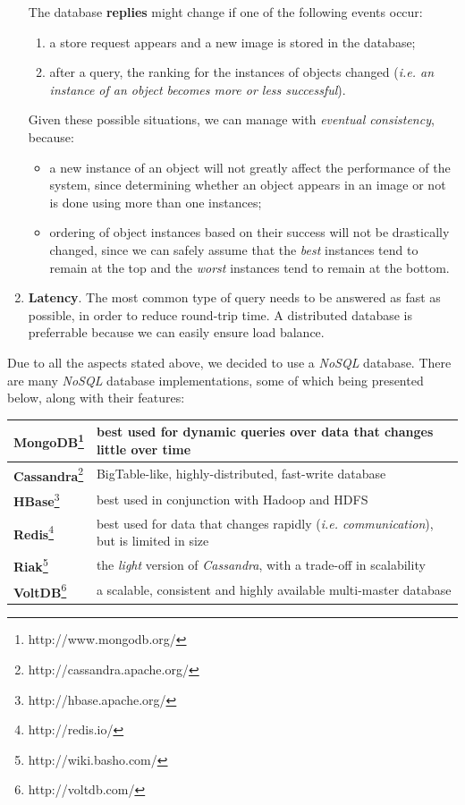 \documentclass[a4paper,onecolumn,oneside,titlepage,11pt]{report}
\begin{document}
\begin{enumerate}
		The database \textbf{replies} might change if one of the following events occur:
		\begin{enumerate}
			\item a store request appears and a new image is stored in the database;
			\item after a query, the ranking for the instances of objects changed (\emph{i.e. an instance of an object becomes more or less successful}).
		\end{enumerate}
		Given these possible situations, we can manage with \emph{eventual consistency}, because:
		\begin{itemize}
			\item a new instance of an object will not greatly affect the performance of the system, since determining whether an object appears in an image or not is done using more than one instances;
			\item ordering of object instances based on their success will not be drastically changed, since we can safely assume that the \emph{best} instances tend to remain at the top and the \emph{worst} instances tend to remain at the bottom.
		\end{itemize}
		\item \textbf{Latency}. The most common type of query needs to be answered as fast as possible, in order to reduce round-trip time. A distributed database is preferrable because we can easily ensure load balance.
	\end{enumerate}
	Due to all the aspects stated above, we decided to use a \emph{NoSQL} database. There are many \emph{NoSQL} database implementations, some of which being presented below, along with their features:
	\begin{center}
			\begin{tabularx}{\linewidth}{|l|X|}
				\hline
				\textbf{MongoDB}\footnote{http://www.mongodb.org/} & best used for dynamic queries over data that changes little over time\\
				\hline
				\textbf{Cassandra}\footnote{http://cassandra.apache.org/} & BigTable-like, highly-distributed, fast-write database\\
				\hline
				\textbf{HBase}\footnote{http://hbase.apache.org/} & best used in conjunction with Hadoop and HDFS\\
				\hline
				\textbf{Redis}\footnote{http://redis.io/} & best used for data that changes rapidly (\emph{i.e. communication}), but is limited in size\\
				\hline
				\textbf{Riak}\footnote{http://wiki.basho.com/} & the \emph{light} version of \emph{Cassandra}, with a trade-off in scalability\\
				\hline
				\textbf{VoltDB}\footnote{http://voltdb.com/} & a scalable, consistent and highly available multi-master database\\
				\hline
			\end{tabularx}
		\end{center}
\end{document}
